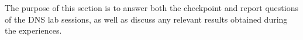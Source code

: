 The purpose of this section is to answer both the checkpoint and report
questions of the DNS lab sessions, as well as discuss any relevant results
obtained during the experiences.





\newpage{}


